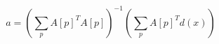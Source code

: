 \begin{equation}
    \label{eq:optimal-parameter-affine}
    a = \left (\sum_p A[p]^T A[p] \right )^{-1} \left (\sum_p A[p]^T d(x) \right)
\end{equation}
